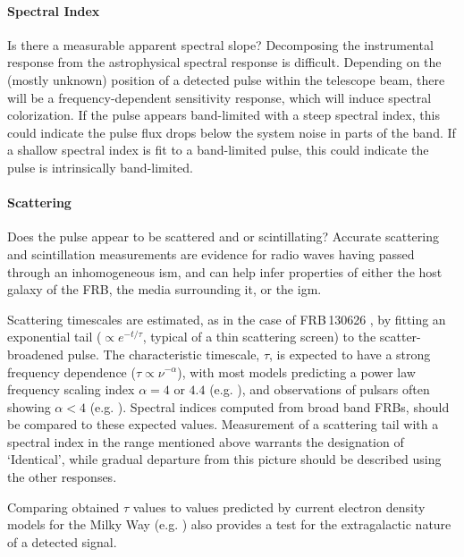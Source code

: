 \documentclass[a4paper,fleqn,usenatbib]{mnras}
\begin{document}
\paragraph{Spectral Index}

Is there a measurable apparent spectral slope? Decomposing the instrumental
response from the astrophysical spectral response is difficult.  Depending on
the (mostly unknown) position of a detected pulse within the telescope beam,
there will be a frequency-dependent sensitivity response, which will induce
spectral colorization.  If the pulse appears band-limited with a steep spectral
index, this could indicate the pulse flux drops below the system noise in parts
of the band. If a shallow spectral index is fit to a band-limited pulse, this
could indicate the pulse is intrinsically band-limited.

\paragraph{Scattering}

Does the pulse appear to be scattered and or scintillating?  Accurate scattering
and scintillation measurements are evidence for radio waves having passed
through an inhomogeneous \gls{ism}, and can help infer properties of either the
host galaxy of the FRB,  the media surrounding it, or the \gls{igm}.

Scattering timescales are estimated, as in the case of FRB\,130626
\citep{2016MNRAS.460L..30C}, by fitting an exponential tail ($\propto
e^{-t/\tau}$, typical of a thin scattering screen) to the scatter-broadened
pulse. The characteristic timescale, $\tau$, is expected to have a strong
frequency dependence ($\tau \propto \nu^{-\alpha}$), with most models predicting
a power law frequency scaling index $\alpha =4$ or $4.4$ (e.g.
\citealt{Rickett1977}), and observations of pulsars often showing $\alpha < 4$
(e.g. \citealt{Lewandowski2015,Geyer2017}).  Spectral indices computed from
broad band FRBs, should be compared to these expected values.  Measurement of a
scattering tail with a spectral index in the range mentioned above warrants the
designation of `Identical', while gradual departure from this picture should be
described using the other responses. 

Comparing obtained $\tau$ values to values predicted by current electron density
models for the Milky Way (e.g.
\citealt{2002astro.ph..7156C,2017ApJ...835...29Y}) also provides a test for the
extragalactic nature of a detected signal.
\end{document}
